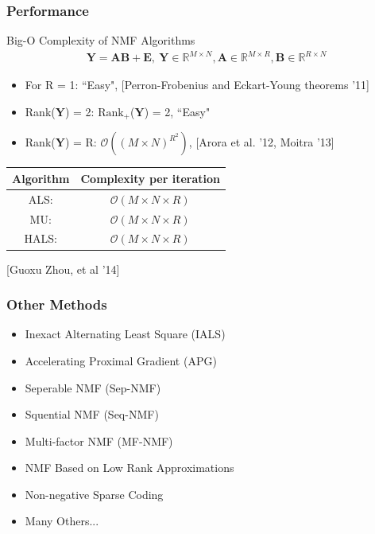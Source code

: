 \documentclass{beamer}
\begin{document}
\begin{frame}
\frametitle{Performance}
Big-O Complexity of NMF Algorithms
\begin{align*}
\mathbf{Y} = \mathbf{A}\mathbf{B} + \mathbf{E}, \ \mathbf{Y}  \in \mathbb{R}^{M \times N}, \mathbf{A}  \in \mathbb{R}^{M \times R}, \mathbf{B}  \in \mathbb{R}^{R \times N}
\end{align*}
\begin{itemize}
\item For R = 1: ``Easy",  [Perron-Frobenius and Eckart-Young theorems '11]
\item Rank($\mathbf{Y}$) = 2: $\text{Rank}_+$($\mathbf{Y}$) = 2, ``Easy"
\item Rank($\mathbf{Y}$) = R: $\mathcal{O}$$((M \times N)^{R^2})$,  [Arora et al. '12, Moitra '13]

\end{itemize}
\begin{table}[h]
      \label{tab:MU} 
\centering
  \begin{tabular}{c || c |  }
        \hline
    Algorithm & Complexity per iteration\\ \hline \hline
    ALS: &  $\mathcal{O}$$(M \times N \times R)$  \\ \hline
    MU:  &  $\mathcal{O}$$(M\times N \times R)$ \\ \hline
    HALS:  &  $\mathcal{O}$$(M\times N \times R)$ \\ \hline
  \end{tabular}
\end{table}
[Guoxu Zhou, et al '14]

\end{frame}

\begin{frame}
\frametitle{Other Methods}
	\begin{itemize}
		\item Inexact Alternating Least Square (IALS)
		\item Accelerating Proximal Gradient (APG)
		\item Seperable NMF (Sep-NMF)
		\item Squential NMF (Seq-NMF)
        \item Multi-factor NMF (MF-NMF)
        \item NMF Based on Low Rank Approximations
        \item Non-negative Sparse Coding
        \item Many Others...
	\end{itemize}
\end{frame}
\end{document}
